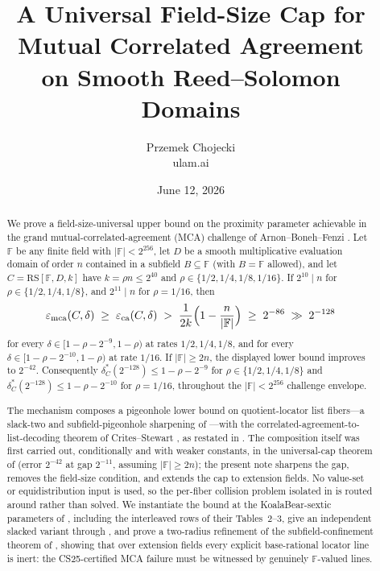 \documentclass[11pt]{article}
\title{A Universal Field-Size Cap for Mutual Correlated Agreement\\ on Smooth Reed--Solomon Domains}
\author{Przemek Chojecki\\ \small ulam.ai}
\date{June 12, 2026}
\theoremstyle{definition}
\theoremstyle{remark}
\newcommand{\F}{\mathbb{F}}
\newcommand{\B}{B}
\newcommand{\RS}{\mathrm{RS}}
\newcommand{\eca}{\varepsilon_{\mathrm{ca}}}
\newcommand{\emca}{\varepsilon_{\mathrm{mca}}}
\begin{document}
\maketitle

\begin{abstract}
We prove a field-size-universal upper bound on the proximity parameter achievable in the grand mutual-correlated-agreement (MCA) challenge of Arnon--Boneh--Fenzi \cite{ABF26}. Let $\F$ be any finite field with $|\F|<2^{256}$, let $D$ be a smooth multiplicative evaluation domain of order $n$ contained in a subfield $\B\subseteq\F$ (with $\B=\F$ allowed), and let $C=\RS[\F,D,k]$ have $k=\rho n\le2^{40}$ and $\rho\in\{1/2,1/4,1/8,1/16\}$. If $2^{10}\mid n$ for $\rho\in\{1/2,1/4,1/8\}$, and $2^{11}\mid n$ for $\rho=1/16$, then
\[
\emca(C,\delta)\;\ge\;\eca(C,\delta)
\;>\;\frac{1}{2k}\Bigl(1-\frac n{|\F|}\Bigr)
\;\ge\;2^{-86}\;\gg\;2^{-128}
\]
for every $\delta\in[1-\rho-2^{-9},1-\rho)$ at rates $1/2,1/4,1/8$, and for every $\delta\in[1-\rho-2^{-10},1-\rho)$ at rate $1/16$. If $|\F|\ge2n$, the displayed lower bound improves to $2^{-42}$. Consequently $\delta^*_C(2^{-128})\le 1-\rho-2^{-9}$ for $\rho\in\{1/2,1/4,1/8\}$ and $\delta^*_C(2^{-128})\le 1-\rho-2^{-10}$ for $\rho=1/16$, throughout the $|\F|<2^{256}$ challenge envelope.

The mechanism composes a pigeonhole lower bound on quotient-locator list fibers---a slack-two and subfield-pigeonhole sharpening of \cite[Main Thm.\,(d)]{Cho26a}---with the correlated-agreement-to-list-decoding theorem of Crites--Stewart \cite{CS25}, as restated in \cite[Thm.~5.3]{ABF26}. The composition itself was first carried out, conditionally and with weaker constants, in the universal-cap theorem of \cite{Cho26b} (error $2^{-42}$ at gap $2^{-11}$, assuming $|\F|\ge2n$); the present note sharpens the gap, removes the field-size condition, and extends the cap to extension fields. No value-set or equidistribution input is used, so the per-fiber collision problem isolated in \cite{Cho26b} is routed around rather than solved. We instantiate the bound at the KoalaBear-sextic parameters of \cite[\S6.3]{ABF26}, including the interleaved rows of their Tables~2--3, give an independent slacked variant through \cite[Thm.~1.9]{BCHKS25}, and prove a two-radius refinement of the subfield-confinement theorem of \cite{Cho26b}, showing that over extension fields every explicit base-rational locator line is inert: the CS25-certified MCA failure must be witnessed by genuinely $\F$-valued lines.
\end{abstract}
\end{document}
